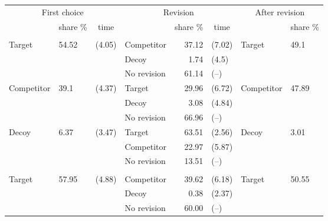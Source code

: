 \begin{table}
\centering
\begin{tabular}{llllrlll}
\toprule
\multicolumn{3}{c}{First choice} & \multicolumn{3}{c}{Revision} & \multicolumn{2}{c}{After revision} \\
\cmidrule(l{3pt}r{3pt}){1-3} \cmidrule(l{3pt}r{3pt}){4-6} \cmidrule(l{3pt}r{3pt}){7-8}
\multicolumn{1}{c}{} & \multicolumn{1}{c}{share \%} & \multicolumn{1}{c}{time} & \multicolumn{1}{c}{} & \multicolumn{1}{c}{share \%} & \multicolumn{1}{c}{time} & \multicolumn{1}{c}{} & \multicolumn{1}{c}{share \%} \\
\cmidrule(l{3pt}r{3pt}){2-2} \cmidrule(l{3pt}r{3pt}){3-3} \cmidrule(l{3pt}r{3pt}){5-5} \cmidrule(l{3pt}r{3pt}){6-6} \cmidrule(l{3pt}r{3pt}){8-8}
\addlinespace[0.3em]
\multicolumn{8}{l}{\textbf{Graphical}}\\
\hspace{1em}Target & 54.52 & (4.05) & Competitor & 37.12 & (7.02) & Target & 49.1\\
\hspace{1em} &  &  & Decoy & 1.74 & (4.5) &  & \\
\hspace{1em} &  &  & No revision & 61.14 & (--) &  & \\
\hspace{1em}Competitor & 39.1 & (4.37) & Target & 29.96 & (6.72) & Competitor & 47.89\\
\hspace{1em} &  &  & Decoy & 3.08 & (4.84) &  & \\
\hspace{1em} &  &  & No revision & 66.96 & (--) &  & \\
\hspace{1em}Decoy & 6.37 & (3.47) & Target & 63.51 & (2.56) & Decoy & 3.01\\
\hspace{1em} &  &  & Competitor & 22.97 & (5.87) &  & \\
\hspace{1em} &  &  & No revision & 13.51 & (--) &  & \\
\addlinespace[0.3em]
\multicolumn{8}{l}{\textbf{Numeric}}\\
\hspace{1em}Target & 57.95 & (4.88) & Competitor & 39.62 & (6.18) & Target & 50.55\\
\hspace{1em} &  &  & Decoy & 0.38 & (2.37) &  & \\
\hspace{1em} &  &  & No revision & 60.00 & (--) &  & \\

\end{tabular}
\end{table}
